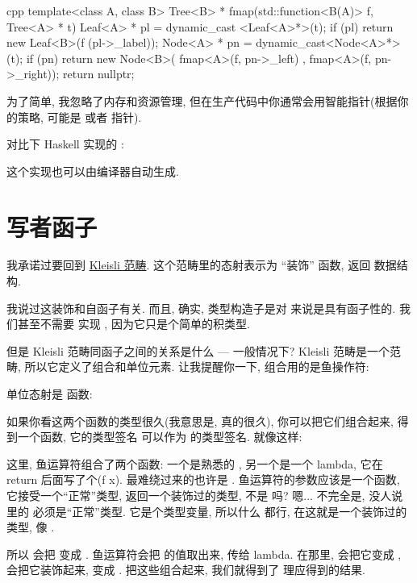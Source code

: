 \begin{snip}{cpp}
template<class A, class B>
Tree<B> * fmap(std::function<B(A)> f, Tree<A> * t) {
    Leaf<A> * pl = dynamic_cast <Leaf<A>*>(t);
    if (pl)
        return new Leaf<B>(f (pl->_label));
    Node<A> * pn = dynamic_cast<Node<A>*>(t);
    if (pn)
        return new Node<B>( fmap<A>(f, pn->_left)
                          , fmap<A>(f, pn->_right));
    return nullptr;
}
\end{snip}
为了简单, 我忽略了内存和资源管理, 但在生产代码中你通常会用智能指针(根据你的策略, 可能是  或者
 指针).

对比下 Haskell 实现的 :

这个实现也可以由编译器自动生成.

\section{写者函子}

我承诺过要回到 \hyperref[kleisli-categories-zh-cn]{Kleisli 范畴}. 这个范畴里的态射表示为 ``装饰'' 函数,
返回  数据结构.

我说过这装饰和自函子有关. 而且, 确实,  类型构造子是对  来说是具有函子性的. 我们甚至不需要
实现 , 因为它只是个简单的积类型.

但是 Kleisli 范畴同函子之间的关系是什么 --- 一般情况下? Kleisli 范畴是一个范畴, 所以它定义了组合和单位元素.
让我提醒你一下, 组合用的是鱼操作符:

单位态射是  函数:

如果你看这两个函数的类型很久(我意思是, 真的很\emph{久}), 你可以把它们组合起来, 得到一个函数, 它的类型签名
可以作为  的类型签名. 就像这样:

这里, 鱼运算符组合了两个函数: 一个是熟悉的 , 另一个是一个 lambda, 它在 return 后面写了个(f x).
最难绕过来的也许是 . 鱼运算符的参数应该是一个函数, 它接受一个``正常''类型, 返回一个装饰过的类型, 不是
吗? 嗯... 不完全是, 没人说  里的  必须是``正常''类型. 它是个类型变量, 所以什么
都行, 在这就是一个装饰过的类型, 像 .

所以  会把  变成 . 鱼运算符会把  的值取出来, 传给 lambda.
在那里,  会把它变成 ,  会把它装饰起来, 变成 . 把这些组合起来,
我们就得到了  理应得到的结果.

